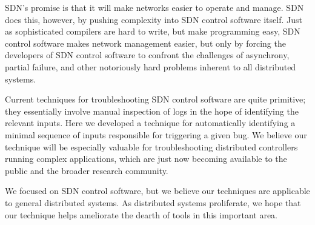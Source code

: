 
SDN's promise is that it will make networks easier to operate and manage. SDN
does this, however, by pushing complexity into SDN control software itself. Just
as sophisticated compilers are hard to write, but make programming easy, SDN
control software makes network management easier, but only by forcing the
developers of SDN control software to confront the challenges of asynchrony,
partial failure, and other notoriously hard problems inherent to all distributed
systems.

Current techniques for troubleshooting SDN control software are quite primitive; they
essentially involve manual inspection of logs in the hope of identifying the
relevant inputs. Here we developed a technique for automatically
identifying a minimal sequence of inputs responsible for triggering a given
bug. We believe our technique will be especially valuable for troubleshooting
distributed controllers running complex applications, which are just now
becoming available to the public and the broader research community.

We focused on SDN control software, but we believe our techniques
are applicable to general distributed systems. As distributed systems
proliferate, we hope that our technique helps ameliorate the dearth of
tools in this important area.


